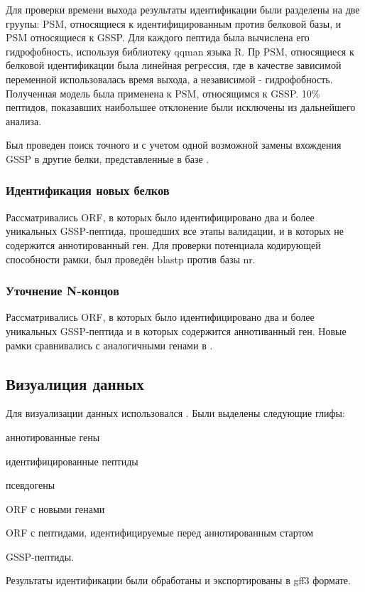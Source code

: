 Для проверки времени выхода результаты идентификации были разделены на две груупы: PSM, относящиеся к идентифицированным против белковой базы, и PSM относящиеся к GSSP. Для каждого пептида была вычислена его гидрофобность, используя библиотеку qqman языка R. Пр PSM, относящиеся к белковой идентификации была линейная регрессия, где в качестве зависимой переменной использовалась время выхода, а независимой - гидрофобность. Полученная модель была применена к PSM, относящимся к GSSP. 10\% пептидов, показавших наибольшее отклонение были исключены из дальнейшего анализа.

Был проведен поиск точного и с учетом одной возможной замены вхождения GSSP в другие белки, представленные в базе .  


\subsubsection{Идентификация новых белков}
Рассматривались ORF, в которых было идентифицировано два и более уникальных GSSP-пептида, прошедших все этапы валидации, и в которых не содержится аннотированный ген. Для проверки потенциала кодирующей способности рамки, был проведён blastp против базы nr. 

\subsubsection{Уточнение N-концов}
Рассматривались ORF, в которых было идентифицировано два и более уникальных GSSP-пептида и в которых содержится аннотиванный ген. Новые рамки сравнивались с аналогичными генами в .


\subsection{Визуалиция данных}
Для визуализации данных использовался . Были выделены следующие глифы: 
\begin{inparaenum}
    \item аннотированные гены
    \item идентифицированные пептиды
    \item псевдогены
    \item ORF с новыми генами
    \item ORF с пептидами, идентифицируемые перед аннотированным стартом
    \item GSSP-пептиды.
\end{inparaenum} Результаты идентификации были обработаны и экспортированы в gff3 формате.


